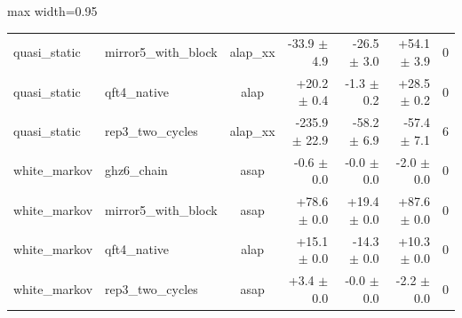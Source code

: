 \begin{table}[t]
\begin{adjustbox}{max width=0.95\textwidth}
\begin{tabular}{llcrrrr}
quasi\_static & mirror5\_with\_block & alap\_xx & -33.9 $\pm$ 4.9 & -26.5 $\pm$ 3.0 & +54.1 $\pm$ 3.9 & 0 \\
quasi\_static & qft4\_native & alap & +20.2 $\pm$ 0.4 & -1.3 $\pm$ 0.2 & +28.5 $\pm$ 0.2 & 0 \\
quasi\_static & rep3\_two\_cycles & alap\_xx & -235.9 $\pm$ 22.9 & -58.2 $\pm$ 6.9 & -57.4 $\pm$ 7.1 & 6 \\
white\_markov & ghz6\_chain & asap & -0.6 $\pm$ 0.0 & -0.0 $\pm$ 0.0 & -2.0 $\pm$ 0.0 & 0 \\
white\_markov & mirror5\_with\_block & asap & +78.6 $\pm$ 0.0 & +19.4 $\pm$ 0.0 & +87.6 $\pm$ 0.0 & 0 \\
white\_markov & qft4\_native & alap & +15.1 $\pm$ 0.0 & -14.3 $\pm$ 0.0 & +10.3 $\pm$ 0.0 & 0 \\
white\_markov & rep3\_two\_cycles & asap & +3.4 $\pm$ 0.0 & -0.0 $\pm$ 0.0 & -2.2 $\pm$ 0.0 & 0 \\
\bottomrule
\end{tabular}
\end{adjustbox}
\end{table}
